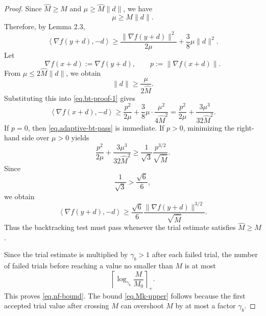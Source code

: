 \begin{itemize}
{              \begin{proof}
                  Since \(\widehat M\ge M\) and \(\mu\ge \widehat M\|d\|\), we have
                  \[
                      \mu\ge M\|d\|.
                  \]
                  Therefore, by Lemma 2.3,
                  \begin{equation}
                      \label{eq.bt-proof-1}
                      \left\langle \nabla f(y+d),-d\right\rangle
                      \ge
                      \frac{\|\nabla f(y+d)\|^2}{2\mu}
                      +
                      \frac{3}{8}\mu\|d\|^2.
                  \end{equation}
                  Let
                  \[
                      \nabla f(x+d):=\nabla f(y+d),
                      \qquad
                      p:=\|\nabla f(x+d)\|.
                  \]
                  From \(\mu\le 2\widehat M\|d\|\), we obtain
                  \[
                      \|d\|\ge \frac{\mu}{2\widehat M}.
                  \]
                  Substituting this into \eqref{eq.bt-proof-1} gives
                  \[
                      \left\langle \nabla f(x+d),-d\right\rangle
                      \ge
                      \frac{p^2}{2\mu}
                      +
                      \frac{3}{8}\mu\cdot \frac{\mu^2}{4\widehat M^2}
                      =
                      \frac{p^2}{2\mu}
                      +
                      \frac{3\mu^3}{32\widehat M^2}.
                  \]
                  If \(p=0\), then \eqref{eq.adaptive-bt-pass} is immediate. If \(p>0\), minimizing the right-hand side over \(\mu>0\) yields
                  \[
                      \frac{p^2}{2\mu}
                      +
                      \frac{3\mu^3}{32\widehat M^2}
                      \ge
                      \frac{1}{\sqrt 3}
                      \frac{p^{3/2}}{\sqrt{\widehat M}}.
                  \]
                  Since
                  \[
                      \frac{1}{\sqrt 3}
                      >
                      \frac{\sqrt 6}{6},
                  \]
                  we obtain
                  \[
                      \left\langle \nabla f(y+d),-d\right\rangle
                      \ge
                      \frac{\sqrt 6}{6}
                      \frac{\|\nabla f(y+d)\|^{3/2}}{\sqrt{\widehat M}}.
                  \]
                  Thus the backtracking test must pass whenever the trial estimate satisfies \(\widehat M\ge M\).

                  Since the trial estimate is multiplied by \(\gamma_b>1\) after each failed trial, the number of failed trials before reaching a value no smaller than \(M\) is at most
                  \[
                      \left\lceil
                      \log_{\gamma_b}\frac{M}{M_0}
                      \right\rceil_+.
                  \]
                  This proves \eqref{eq.nf-bound}. The bound \eqref{eq.Mk-upper} follows because the first accepted trial value after crossing \(M\) can overshoot \(M\) by at most a factor \(\gamma_b\).
              \end{proof}

}
\end{itemize}
